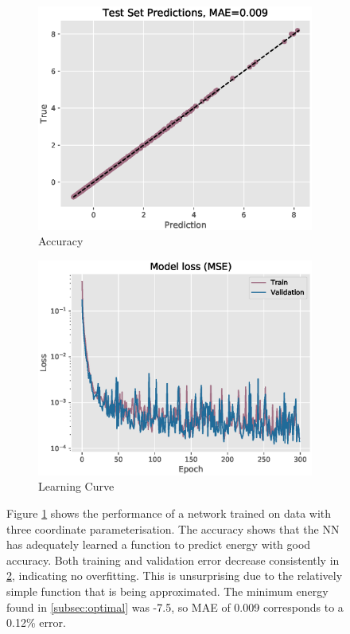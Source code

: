 \documentclass[12pt,a4paper]{article}
\begin{document}
\begin{figure}[h!]
\centering
    \begin{subfigure}[t]{0.49\textwidth}
        \includegraphics[width = \linewidth]{images/prediction1.eps}
        \caption{Accuracy}
        \label{fig:3acc}
    \end{subfigure}
    \begin{subfigure}[t]{0.49\textwidth}
        \includegraphics[width = \linewidth]{images/loss1.eps}
        \caption{Learning Curve}
        \label{fig:3loss}
    \end{subfigure}
\caption{Figure \ref{fig:3acc} shows the performance of a network trained on data with three coordinate parameterisation. The accuracy shows that the NN has adequately learned a function to predict energy with good accuracy. Both training and validation error decrease consistently in \ref{fig:3loss}, indicating no overfitting. This is unsurprising due to the relatively simple function that is being approximated. The minimum energy found in \ref{subsec:optimal} was -7.5, so MAE of 0.009 corresponds to a 0.12\% error.}
\label{fig:Net1}
\end{figure}
\end{document}
